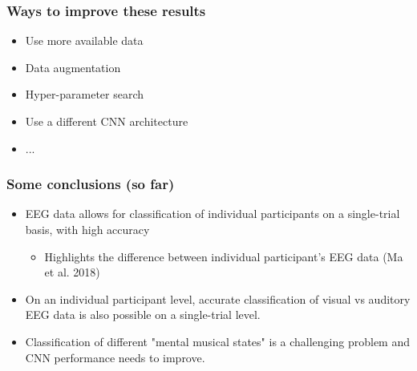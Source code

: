 \documentclass{beamer}
\begin{document}
\begin{frame}
	\frametitle{Ways to improve these results}

	\begin{itemize}
		
		\item Use more available data

		\item Data augmentation

		\item Hyper-parameter search

		\item Use a different CNN architecture

		\item ...

	\end{itemize}

\end{frame}

\begin{frame}
	\frametitle{Some conclusions (so far)}

	\begin{itemize}
		
		\item EEG data allows for classification of individual participants on a single-trial basis, with high accuracy 
		\begin{itemize}
			\item Highlights the difference between individual participant's EEG data (Ma et al. 2018)
		\end{itemize}
		
		\item On an individual participant level, accurate classification of visual vs auditory EEG data is also possible on a single-trial level. 

		\item Classification of different "mental musical states" is a challenging problem and CNN performance needs to improve.

	\end{itemize}

\end{frame}
\end{document}
